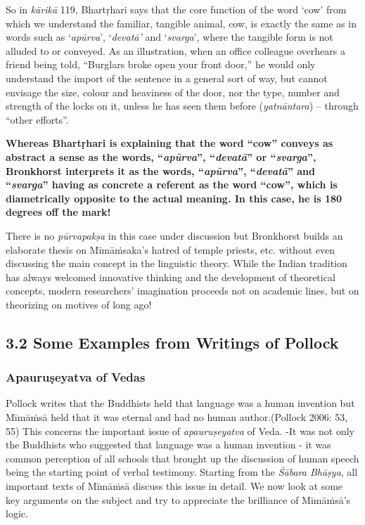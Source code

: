 So in \textit{kārikā} 119, Bhartṛhari says that the core function of the word ‘cow’ from which we understand the familiar, tangible animal, cow, is exactly the same as in words such as ‘\textit{apūrva}’, ‘\textit{devatā’} and ‘\textit{svarga}’, where the tangible form is not alluded to or conveyed. As an illustration, when an office colleague overhears a friend being told, “Burglars broke open your front door,” he would only understand the import of the sentence in a general sort of way, but cannot envisage the size, colour and heaviness of the door, nor the type, number and strength of the locks on it, unless he has seen them before (\textit{yatnāntara}) – through “other efforts”.

\textbf{Whereas Bhartṛhari is explaining that the word “cow” conveys as abstract a sense as the words, “\textit{apūrva}”, “\textit{devatā}” or “\textit{svarga}”, Bronkhorst interprets it as the words, “\textit{apūrva}”, “\textit{devatā}” and “\textit{svarga}” having as concrete a referent as the word “cow”, which is diametrically opposite to the actual meaning. In this case, he is 180 degrees off the mark!}

There is no \textit{pūrvapakṣa} in this case under discussion but Bronkhorst builds an elaborate thesis on Mīmāṁsaka’s hatred of temple priests, etc. without even discussing the main concept in the linguistic theory. While the Indian tradition has always welcomed innovative thinking and the development of theoretical concepts, modern researchers’ imagination proceeds not on academic lines, but on theorizing on motives of long ago!


\subsection*{3.2 Some Examples from Writings of Pollock}

\subsubsection*{Apauruṣeyatva of Vedas}

Pollock writes that the Buddhists held that language was a human invention but Mīmāṁsā held that it was eternal and had no human author.(Pollock 2006: 53, 55) This concerns the important issue of \textit{apauruṣeyatva} of Veda. -It was not only the Buddhists who suggested that language was a human invention - it was common perception of all schools that brought up the discussion of human speech being the starting point of verbal testimony. Starting from the \textit{Śābara Bhāṣya}, all important texts of Mīmāṁsā discuss this issue in detail. We now look at some key arguments on the subject and try to appreciate the brilliance of Mīmāṁsā’s logic.


